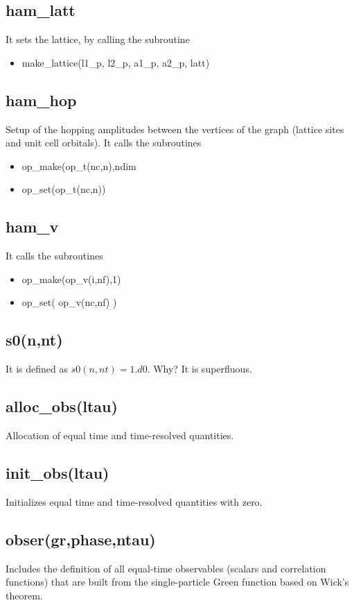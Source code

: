 \documentclass[10pt,Arial]{article}
\begin{document}
\subsection{ham\_latt}
It sets the lattice, by calling the subroutine
\begin{itemize}
\item make\_lattice(l1\_p, l2\_p, a1\_p,  a2\_p, latt)
\end{itemize}

\subsection{ham\_hop}
Setup of the hopping amplitudes between the vertices of the graph (lattice sites and unit cell orbitals). 
It calls the subroutines
\begin{itemize}
\item op\_make(op\_t(nc,n),ndim
\item op\_set(op\_t(nc,n))
\end{itemize}

\subsection{ham\_v}
It calls the subroutines
\begin{itemize}
\item op\_make(op\_v(i,nf),1)
\item op\_set( op\_v(nc,nf) )
\end{itemize}
\subsection{s0(n,nt)}
It is defined as $s0(n,nt)=1.d0$. Why? It is superfluous.

\subsection{alloc\_obs(ltau)}
Allocation of equal time and time-resolved quantities.

\subsection{init\_obs(ltau)}
Initializes equal time and time-resolved quantities with zero.

\subsection{obser(gr,phase,ntau)}
Includes the definition of all equal-time observables (scalars and correlation functions) that are built from the single-particle Green function based on 
Wick's theorem.
\end{document}
